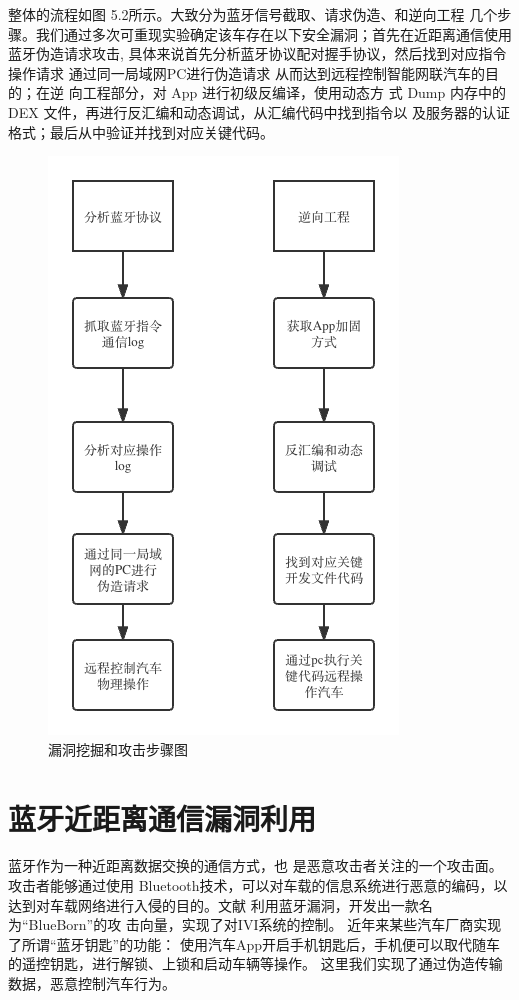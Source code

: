 整体的流程如图 5.2所示。大致分为蓝牙信号截取、请求伪造、和逆向工程
几个步骤。我们通过多次可重现实验确定该车存在以下安全漏洞；首先在近距离通信使用蓝牙伪造请求攻击, 具体来说首先分析蓝牙协议配对握手协议，然后找到对应指令操作请求
通过同一局域网PC进行伪造请求 从而达到远程控制智能网联汽车的目的；在逆
向工程部分，对 App 进行初级反编译，使用动态方
式 Dump 内存中的 DEX 文件，再进行反汇编和动态调试，从汇编代码中找到指令以
及服务器的认证格式；最后从中验证并找到对应关键代码。
\begin{figure}
  \centering
  \includegraphics[scale=0.5]{resources/img/i23.png}
  \caption{漏洞挖掘和攻击步骤图}
\end{figure}
\newline
\section {蓝牙近距离通信漏洞利用}
蓝牙作为一种近距离数据交换的通信方式，也
是恶意攻击者关注的一个攻击面。攻击者能够通过使用 Bluetooth技术，可以对车载的信息系统进行恶意的编码，以达到对车载网络进行入侵的目的。文献\cite{antian}
利用蓝牙漏洞，开发出一款名为“BlueBorn”的攻
击向量，实现了对IVI系统的控制。
近年来某些汽车厂商实现了所谓“蓝牙钥匙”的功能：
使用汽车App开启手机钥匙后，手机便可以取代随车的遥控钥匙，进行解锁、上锁和启动车辆等操作。
这里我们实现了通过伪造传输数据，恶意控制汽车行为。
